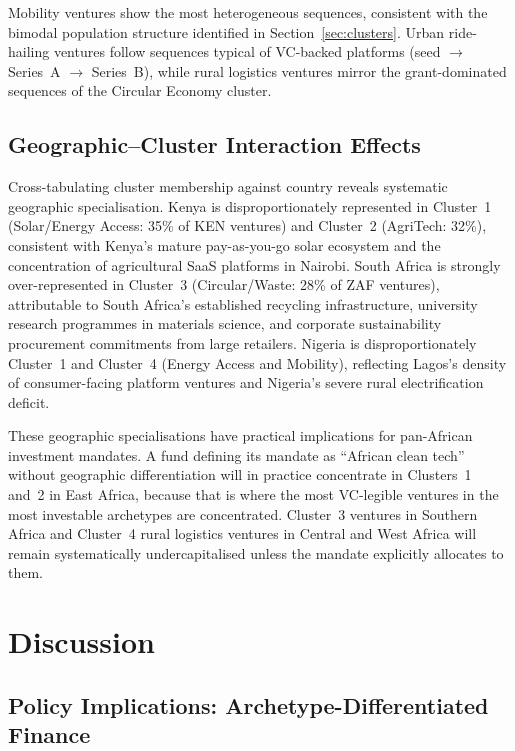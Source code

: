 \documentclass[review,12pt]{elsarticle}
\begin{document}
Mobility ventures show the most heterogeneous sequences, consistent
with the bimodal population structure identified in
Section~\ref{sec:clusters}. Urban ride-hailing ventures follow
sequences typical of VC-backed platforms (seed $\to$ Series~A $\to$
Series~B), while rural logistics ventures mirror the grant-dominated
sequences of the Circular Economy cluster.

\subsection{Geographic--Cluster Interaction Effects}

Cross-tabulating cluster membership against country reveals systematic
geographic specialisation. Kenya is disproportionately represented in
Cluster~1 (Solar/Energy Access: 35\% of KEN ventures) and Cluster~2
(AgriTech: 32\%), consistent with Kenya's mature pay-as-you-go solar
ecosystem and the concentration of agricultural SaaS platforms in
Nairobi. South Africa is strongly over-represented in Cluster~3
(Circular/Waste: 28\% of ZAF ventures), attributable to South
Africa's established recycling infrastructure, university research
programmes in materials science, and corporate sustainability
procurement commitments from large retailers. Nigeria is
disproportionately Cluster~1 and Cluster~4 (Energy Access and
Mobility), reflecting Lagos's density of consumer-facing platform
ventures and Nigeria's severe rural electrification deficit.

These geographic specialisations have practical implications for
pan-African investment mandates. A fund defining its mandate as
``African clean tech'' without geographic differentiation will in
practice concentrate in Clusters~1 and~2 in East Africa, because
that is where the most VC-legible ventures in the most investable
archetypes are concentrated. Cluster~3 ventures in Southern Africa
and Cluster~4 rural logistics ventures in Central and West Africa
will remain systematically undercapitalised unless the mandate
explicitly allocates to them.


\section{Discussion}
\label{sec:discussion}

\subsection{Policy Implications: Archetype-Differentiated Finance}
\end{document}
